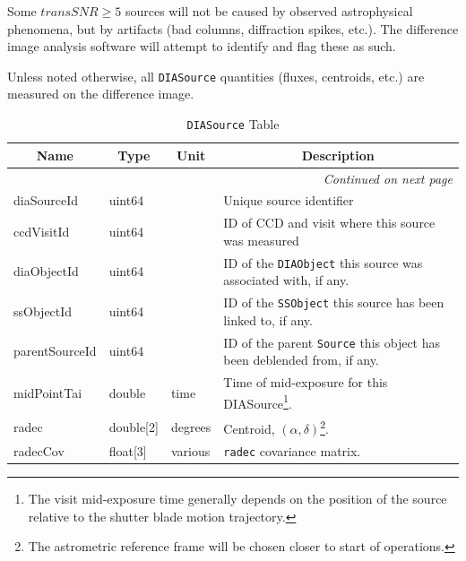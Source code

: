 \documentclass[12pt]{article}
\newcommand{\code}[1]{\texttt{#1}}
\newcommand{\DIASource}{\code{DIASource}\xspace}
\newcommand{\DIAObject}{\code{DIAObject}\xspace}
\newcommand{\Source}{\code{Source}\xspace}
\newcommand{\SSObject}{\code{SSObject}\xspace}
\newcommand{\transSNR}{5\xspace}
\newcommand{\req}[1]{\marginpar{\tiny #1}}
\newcommand{\dmreq}[1]{\req{DMS-REQ-#1}}
\begin{document}
Some $transSNR \geq \transSNR$ sources will not be caused by observed astrophysical phenomena, but by artifacts (bad columns, diffraction spikes, etc.). The difference image analysis software will attempt to identify and flag these as such.

Unless noted otherwise, all \DIASource quantities (fluxes, centroids, etc.) are measured on the difference image.

\dmreq{0269}

\begin{center}
\begin{longtable}{p{3cm}p{2cm}p{2cm}p{5cm}}
\caption[\DIASource Table]{\DIASource Table
} \\

\hline \multicolumn{1}{c}{\bf Name} & \multicolumn{1}{c}{\bf Type} & \multicolumn{1}{c}{\bf Unit} & \multicolumn{1}{c}{\bf Description} \\ \hline
\endhead

\hline \multicolumn{4}{r}{{\em Continued on next page}} \\
\endfoot

\hline\hline
\endlastfoot

diaSourceId & uint64 & ~ & Unique source identifier \\

ccdVisitId & uint64 & ~ & ID of CCD and visit where this source was measured \\

diaObjectId & uint64 & ~ & ID of the \DIAObject this source was associated with, if any. \\

ssObjectId & uint64 & ~ & ID of the \SSObject this source has been linked to, if any. \\

parentSourceId & uint64 & ~ & ID of the parent \Source this object has been deblended from, if any. \\

midPointTai & double & time & Time of mid-exposure for this DIASource\footnote{The visit mid-exposure
time generally depends on the position of the source relative to the shutter blade motion trajectory.}. \\

radec & double[2] & degrees & Centroid, $(\alpha, \delta)$\footnote{The astrometric reference frame will be chosen closer to start of operations.}. \\

radecCov & float[3] & various & \texttt{radec} covariance matrix. \\


\end{longtable}
\end{center}
\end{document}
